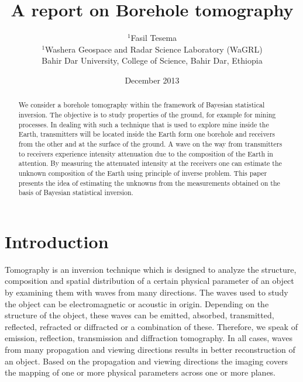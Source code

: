 \documentclass[12pt,A4]{article}
\title{ A report on Borehole tomography}
\author{\small $^{1}$Fasil Tesema  \\  \small {\color{black}$^{1}$Washera Geospace and Radar Science Laboratory (WaGRL)}\\\small  {\color{black}Bahir Dar University, College of Science,  Bahir Dar, Ethiopia }  \\ }%
\date{December 2013}
\begin{document}
\maketitle

\begin{abstract}
We consider a borehole tomography within the framework of Bayesian statistical inversion. The objective is to study properties of the ground, for example for mining processes. In dealing with such a technique that is used to explore mine inside the Earth, transmitters will be located inside the Earth form one borehole and receivers from the other and at the surface of the ground. A wave on the way from transmitters to receivers experience intensity attenuation due to the composition of the Earth in attention. By measuring the attenuated intensity at the receivers one can estimate the unknown composition of the Earth using principle of inverse problem. This paper presents the idea of estimating the unknowns from the measurements obtained on the basis of Bayesian statistical inversion.


\end{abstract}

\section{Introduction}
Tomography is an inversion technique which is designed to analyze the structure, composition and spatial distribution of a certain physical parameter of an object by examining them with waves from many directions. The waves used to study the object can be electromagnetic or acoustic in origin. Depending on the structure of the object, these waves can be emitted, absorbed, transmitted, reflected, refracted or diffracted or a combination of these. Therefore, we speak of emission, reflection, transmission and diffraction tomography. In all cases, waves from many propagation and viewing directions results in better reconstruction of an object. 
Based on the propagation and viewing directions the imaging covers the mapping of one or more physical parameters across one or more planes.  \\
\end{document}
